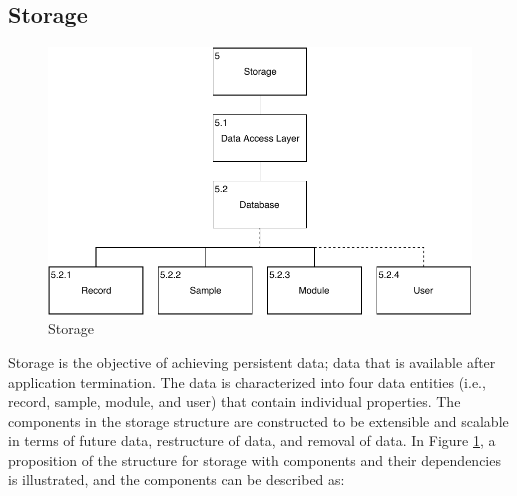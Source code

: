\subsection{Storage}\label{soc:storage}

\begin{figure}
    \centering
    \includegraphics[scale=0.7]{images/Storage.pdf}
    \caption{Storage}
    \label{fig:hta_storage}
\end{figure}

Storage is the objective of achieving persistent data; data that is available after application termination. The data is characterized into four data entities (i.e., record, sample, module, and user) that contain individual properties.  The components in the storage structure are constructed to be extensible and scalable in terms of future data, restructure of data, and removal of data.  In Figure \ref{fig:hta_storage}, a proposition of the structure for storage with components and their dependencies is illustrated, and the components can be described as:

